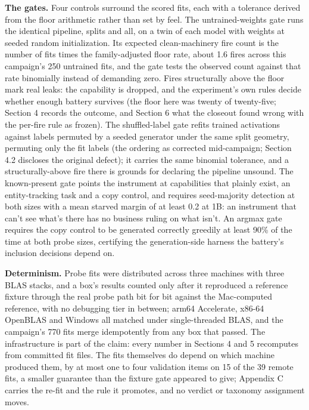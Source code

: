 \textbf{The gates.} Four controls surround the scored fits, each with a
tolerance derived from the floor arithmetic rather than set by feel.
The untrained-weights gate runs the identical pipeline, splits and
all, on a twin of each model with weights at seeded random
initialization. Its expected clean-machinery fire count is the number
of fits times the family-adjusted floor rate, about 1.6 fires across
this campaign's 250 untrained fits, and the gate tests the observed
count against that rate binomially instead of demanding zero. Fires
structurally above the floor mark real leaks: the capability is
dropped, and the experiment's own rules decide whether enough battery
survives (the floor here was twenty of twenty-five; Section 4 records
the outcome, and Section 6 what the closeout found wrong with the
per-fire rule as frozen). The shuffled-label gate refits trained
activations against labels permuted by a seeded generator under the
same split geometry, permuting only the fit labels (the ordering as
corrected mid-campaign; Section 4.2 discloses the original defect); it
carries the same binomial tolerance, and a structurally-above fire
there is grounds for declaring the pipeline unsound. The known-present
gate points the instrument at capabilities that plainly exist, an
entity-tracking task and a copy control, and requires seed-majority
detection at both sizes with a mean starved margin of at least 0.2 at
1B: an instrument that can't see what's there has no business ruling
on what isn't. An argmax gate requires the copy control to be
generated correctly greedily at least 90\% of the time at both probe
sizes, certifying the generation-side harness the battery's inclusion
decisions depend on.

\textbf{Determinism.} Probe fits were distributed across three machines
with three BLAS stacks, and a box's results counted only after it
reproduced a reference fixture through the real probe path bit for
bit against the Mac-computed reference, with no debugging tier in
between; arm64 Accelerate, x86-64 OpenBLAS and Windows all matched
under single-threaded BLAS, and the campaign's 770 fits merge
idempotently from any box that passed. The infrastructure is part of
the claim: every number in Sections 4 and 5 recomputes from committed
fit files. The fits themselves do depend on which machine produced
them, by at most one to four validation items on 15 of the 39 remote
fits, a smaller guarantee than the fixture gate appeared to give;
Appendix C carries the re-fit and the rule it promotes, and no verdict
or taxonomy assignment moves.

